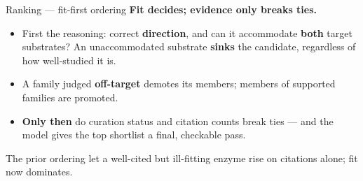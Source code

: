 \documentclass[aspectratio=169,11pt]{beamer}
\newcommand{\hl}[1]{{\color{brand}\textbf{#1}}}
\newcommand{\hlt}[1]{{\color{brand2}\textbf{#1}}}
\newcommand{\hla}[1]{{\color{accent}\textbf{#1}}}
\begin{document}
\begin{frame}{Ranking --- fit-first ordering}
  \hl{Fit decides; evidence only breaks ties.}
  \begin{itemize}
    \item First the reasoning: correct \hl{direction}, and can it accommodate
      \hl{both} target substrates? An unaccommodated substrate \hla{sinks} the
      candidate, regardless of how well-studied it is.
    \item A family judged \hlt{off-target} demotes its members; members of supported
      families are promoted.
    \item \hl{Only then} do curation status and citation counts break ties --- and the
      model gives the top shortlist a final, checkable pass.
  \end{itemize}
  \vspace{0.5em}
  \begin{center}
  \end{center}
  \vspace{0.2em}
  \begin{center}{\footnotesize\color{muted} The prior ordering let a well-cited but
    ill-fitting enzyme rise on citations alone; fit now dominates.}\end{center}
\end{frame}
\end{document}
